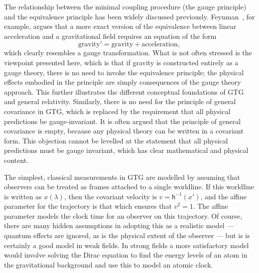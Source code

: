 \documentclass[a4paper]{article}
\numberwithin{equation}{section}
\newcommand{\lam}{\lambda}
\newcommand{\lih}{\mathsf{h}}
\newcommand{\hu}{\lih}
\begin{document}
The relationship between the minimal coupling procedure (the gauge
principle) and the equivalence principle has been widely discussed
previously.  Feynman~\cite{fey-grav}, for example, argues that a more
exact version of the equivalence between linear acceleration and a
gravitational field requires an equation of the form
%
\begin{equation}
\mbox{gravity}' = \mbox{gravity} + \mbox{acceleration},
\end{equation}
%
which clearly resembles a gauge transformation.  What is not often
stressed is the viewpoint presented here, which is that if gravity is
constructed entirely as a gauge theory, there is no need to invoke the
equivalence principle; the physical effects embodied in the principle
are simply consequences of the gauge theory approach.  This further
illustrates the different conceptual foundations of GTG and general
relativity.  Similarly, there is no need for the principle of general
covariance in GTG, which is replaced by the requirement that all
physical predictions be gauge-invariant.  It is often argued that the
principle of general covariance is empty, because any physical theory
can be written in a covariant form.  This objection cannot be levelled
at the statement that all physical predictions must be gauge
invariant, which has clear mathematical and physical content.


The simplest, classical measurements in GTG are modelled by assuming
that observers can be treated as frames attached to a single
worldline.  If this worldline is written as $x(\lam)$, then the
covariant velocity is $v=\hu^{-1}(x')$, and the affine parameter
for the trajectory is that which ensures that $v^2=1$.  The affine
parameter models the clock time for an observer on this trajectory.
Of course, there are many hidden assumptions in adopting this as a
realistic model --- quantum effects are ignored, as is the physical
extent of the observer --- but is is certainly a good model in weak
fields.  In strong fields a more satisfactory model would involve
solving the Dirac equation to find the energy levels of an atom in the
gravitational background and use this to model an atomic clock.
\end{document}
